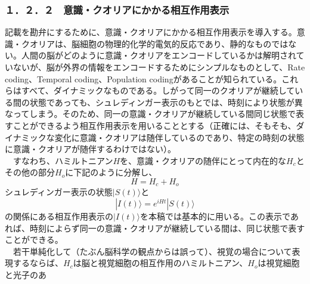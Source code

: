 \subsubsection{１．２．２　意識・クオリアにかかる相互作用表示}
記載を勘弁にするために、意識・クオリアにかかる相互作用表示を導入する。意識・クオリアは、脳細胞の物理的化学的電気的反応であり、静的なものではない。人間の脳がどのように意識・クオリアをエンコードしているかは解明されていないが、脳が外界の情報をエンコードするためにシンプルなものとして、Rate coding、Temporal coding、Population codingがあることが知られている\cite{wikipediac}。これらはすべて、ダイナミックなものである。しがって同一のクオリアが継続している間の状態であっても、シュレディンガー表示のもとでは、時刻により状態が異なってしまう。そのため、同一の意識・クオリアが継続している間同じ状態で表すことができるよう相互作用表示を用いることとする（正確には、そもそも、ダイナミックな変化に意識・クオリアは随伴しているのであり、特定の時刻の状態に意識・クオリアが随伴するわけではない）。\\
　すなわち、ハミルトニアン$H$を、意識・クオリアの随伴にとって内在的な$H_c$とその他の部分$H_o$に下記のように分解し、
　\begin{equation}
  H=H_c + H_o
\end{equation}
シュレディンガー表示の状態$|S(t)\rangle$と
　\begin{equation}
  |I(t)\rangle = e^{iHt}|S(t)\rangle
\end{equation}
の関係にある相互作用表示の$|I(t)\rangle$を本稿では基本的に用いる。この表示であれば、時刻によらず同一の意識・クオリアが継続している間は、同じ状態で表すことができる。\\
　若干単純化して（たぶん脳科学の観点からは誤って）、視覚の場合について表現するならば、$H_c$は脳と視覚細胞の相互作用のハミルトニアン、$H_o$は視覚細胞と光子のあ

